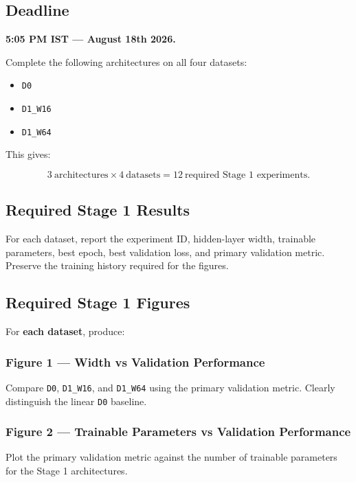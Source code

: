 \documentclass[11pt,a4paper]{article}
\newcommand{\code}[1]{\texttt{#1}}
\begin{document}
\subsection{Deadline}

\textbf{5:05 PM IST --- August 18th 2026.}

Complete the following architectures on all four datasets:

\begin{itemize}
    \item \code{D0}
    \item \code{D1\_W16}
    \item \code{D1\_W64}
\end{itemize}

This gives:

\[
3\ \text{architectures}\times4\ \text{datasets}
=12\ \text{required Stage 1 experiments}.
\]

\subsection{Required Stage 1 Results}

For each dataset, report the experiment ID, hidden-layer width, trainable parameters, best epoch, best validation loss, and primary validation metric. Preserve the training history required for the figures.

\subsection{Required Stage 1 Figures}

For \textbf{each dataset}, produce:

\subsubsection*{Figure 1 --- Width vs Validation Performance}

Compare \code{D0}, \code{D1\_W16}, and \code{D1\_W64} using the primary validation metric. Clearly distinguish the linear \code{D0} baseline.

\subsubsection*{Figure 2 --- Trainable Parameters vs Validation Performance}

Plot the primary validation metric against the number of trainable parameters for the Stage 1 architectures.
\end{document}
